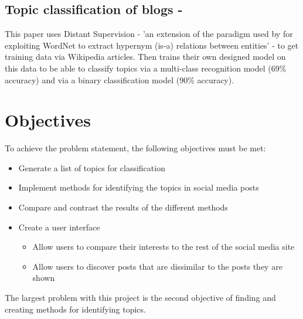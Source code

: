 \subsection{Topic classification of blogs - \cite{husby2012topic}}
This paper uses Distant Supervision - 'an extension of the paradigm used by \cite{snow} for exploiting WordNet to extract hypernym (is-a) relations between entities'
- to get training data via Wikipedia articles. Then trains their own designed model on this data to be able to classify topics via a
multi-class recognition model (69\% accuracy) and via a binary classification model (90\% accuracy).

\section{Objectives}
To achieve the problem statement, the following objectives must be met:
\begin{itemize}
    \item Generate a list of topics for classification
    \item Implement methods for identifying the topics in social media posts
    \item Compare and contrast the results of the different methods
    \item Create a user interface
    \begin {itemize}
        \item Allow users to compare their interests to the rest of the social media site
        \item Allow users to discover posts that are dissimilar to the posts they are shown
    \end{itemize}
\end{itemize}
The largest problem with this project is the second objective of finding and creating methods for identifying topics.